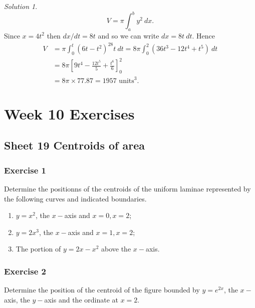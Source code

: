 \documentclass[
  11pt,
  oneside]{book}
\providecommand{\tightlist}{%
  \setlength{\itemsep}{0pt}\setlength{\parskip}{0pt}}
\newcommand{\slide}{}
\theoremstyle{definition}
\theoremstyle{definition}
\theoremstyle{definition}
\theoremstyle{definition}
\theoremstyle{remark}
\newtheorem*{solution}{Solution}
\begin{document}
\begin{solution}
\[
V = \pi\int_a^b y^2\ dx.
\]
Since \(x=4t^2\) then \(dx/dt = 8t\) and so we can write \(dx = 8t\ dt\). Hence
\begin{align*}
V& = \pi\int_0^t(6t-t^2)^28t\ dt = 8\pi\int_0^2(36t^3-12t^4+t^5)\ dt\\
& = 8\pi\left[9t^4-\frac{12t^5}5+\frac{t^6}6\right]_0^2\\
&= 8\pi\times77.87 = 1957 \text{ units}^3.
\end{align*}
\end{solution}

\chapter*{Week 10 Exercises}\label{week-10-exercises}

\section{Sheet 19 Centroids of area}\label{sheet-19-centroids-of-area}

\slide

\subsection*{Exercise 1}\label{exercise-1-10}

Determine the positionns of the centroids of the uniform laminae represented by the following curves and indicated boundaries.

\begin{enumerate}
\def\labelenumi{\arabic{enumi}.}
\tightlist
\item
  \(y=x^2\), the \(x-\)axis and \(x=0, x=2\);
\item
  \(y=2x^3\), the \(x-\)axis and \(x=1, x=2\);
\item
  The portion of \(y=2x-x^2\) above the \(x-\)axis.
\end{enumerate}

\slide

\subsection*{Exercise 2}\label{exercise-2-10}

Determine the position of the centroid of the figure bounded by \(y = e^{2x}\), the \(x-\)axis, the \(y-\)axis and the ordinate at \(x = 2\).
\end{document}
